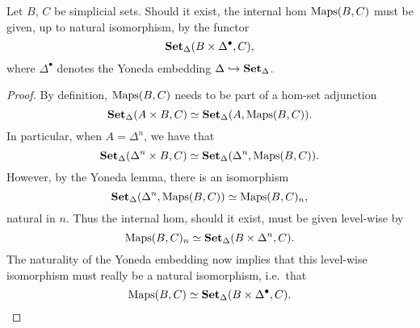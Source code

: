 \documentclass[main.tex]{subfiles}
\begin{document}
\begin{lemma}
  \label{lemma:form_of_internal_hom}
  Let $B$, $C$ be simplicial sets. Should it exist, the internal hom $\operatorname{Maps}(B, C)$ must be given, up to natural isomorphism, by the functor
  \begin{equation*}
    \operatorname{\mathbf{Set}_{\Delta}}(B \times \Delta^{\bullet}, C),
  \end{equation*}
  where $\Delta^{\bullet}$ denotes the Yoneda embedding $\Delta \hookrightarrow \operatorname{\mathbf{Set}_{\Delta}}$.
\end{lemma}
\begin{proof}
  By definition, $\operatorname{Maps}(B, C)$ needs to be part of a hom-set adjunction
  \begin{equation*}
    \operatorname{\mathbf{Set}_{\Delta}}(A \times B, C) \simeq \operatorname{\mathbf{Set}_{\Delta}}(A, \operatorname{Maps}(B, C)).
  \end{equation*}
  In particular, when $A = \Delta^{n}$, we have that
  \begin{equation*}
    \operatorname{\mathbf{Set}_{\Delta}}(\Delta^{n} \times B, C) \simeq \operatorname{\mathbf{Set}_{\Delta}}(\Delta^{n}, \operatorname{Maps}(B, C)).
  \end{equation*}
  However, by the Yoneda lemma, there is an isomorphism
  \begin{equation*}
    \operatorname{\mathbf{Set}_{\Delta}}(\Delta^{n}, \operatorname{Maps}(B, C)) \simeq \operatorname{Maps}(B, C)_{n},
  \end{equation*}
  natural in $n$. Thus the internal hom, should it exist, must be given level-wise by
  \begin{equation*}
    \operatorname{Maps}(B, C)_{n} \simeq \operatorname{\mathbf{Set}_{\Delta}}(B \times \Delta^{n}, C).
  \end{equation*}
  The naturality of the Yoneda embedding now implies that this level-wise isomorphism must really be a natural isomorphism, i.e.\ that
  \begin{equation*}
    \operatorname{Maps}(B, C) \simeq \operatorname{\mathbf{Set}_{\Delta}}(B \times \Delta^{\bullet}, C).
  \end{equation*}
\end{proof}
\end{document}
